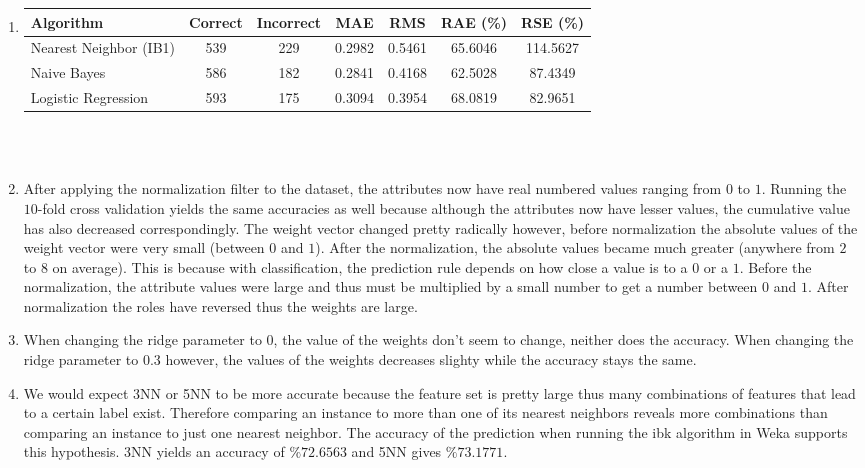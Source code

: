 \documentclass{article}
\begin{document}
\begin{enumerate}
\begin{enumerate}
                \item
                    \begin{tabular}{l | c c c c c c}
                        Algorithm      & Correct & Incorrect & MAE & RMS & RAE (\%) & RSE (\%)\\
                        \hline
                        Nearest Neighbor (IB1) & 539 & 229 & 0.2982 & 0.5461 & 65.6046 & 114.5627 \\
                        Naive Bayes            & 586 & 182 & 0.2841 & 0.4168 & 62.5028 & 87.4349 \\
                        Logistic Regression    & 593 & 175 & 0.3094 & 0.3954 & 68.0819 & 82.9651
                    \end{tabular}\\\\
                \item
                   After applying the normalization filter to the dataset, the attributes now have real                		numbered values ranging from $0$ to $1$.
		Running the $10$-fold cross validation yields the same accuracies as well because 					although the attributes now have lesser values, the cumulative value has also decreased 			correspondingly.
		The weight vector changed pretty radically however, before normalization the absolute 			values of the weight vector were very small (between $0$ and $1$). After the 					normalization, the absolute values became much greater (anywhere from $2$ to $8$ on 			average). This is because with classification, the prediction rule depends on how close a 			value is to a $0$ or a $1$. Before the normalization, the attribute values were large and 			thus must be multiplied by a small number to get a number between $0$ and $1$. After 			normalization the roles have reversed thus the weights are large.
                \item
	          When changing the ridge parameter to $0$, the value of the weights don't seem to 				change, neither does the accuracy.
		When changing the ridge parameter to $0.3$ however, the values of the weights 					decreases slighty while the accuracy stays the same. 
                \item
	          We would expect 3NN or 5NN to be more accurate because the feature set is pretty 				large thus many combinations of features that lead to a certain label exist. Therefore 				comparing an instance to more than one of its nearest neighbors reveals more 					combinations than comparing an instance to just one nearest neighbor. The accuracy of 			the prediction when running the ibk algorithm in Weka supports this hypothesis. 3NN 				yields an accuracy of $\%72.6563$ and 5NN gives $\%73.1771$.

\end{enumerate}
\end{enumerate}
\end{document}
